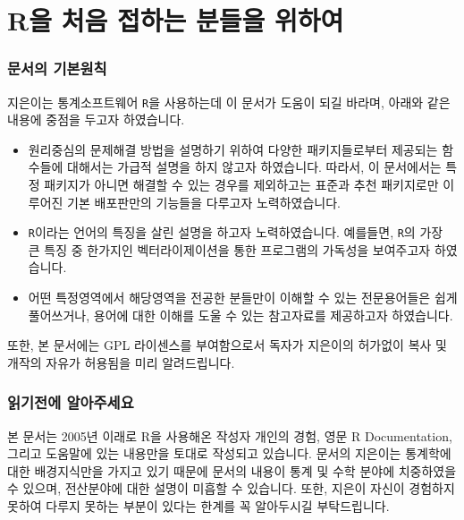 \documentclass[tutorial.tex]{subfiles}
\begin{document}
	
\part{R을 처음 접하는 분들을 위하여}

\section*{문서의 기본원칙} 

지은이는 통계소프트웨어 \texttt{R}을 사용하는데 이 문서가 도움이 되길 바라며, 아래와 같은 내용에 중점을 두고자 하였습니다. 

\begin{itemize}
\item 원리중심의 문제해결 방법을 설명하기 위하여 다양한 패키지들로부터 제공되는 함수들에 대해서는 가급적 설명을 하지 않고자 하였습니다. 
따라서, 이 문서에서는 특정 패키지가 아니면 해결할 수 있는 경우를 제외하고는 표준과 추천 패키지로만 이루어진 기본 배포판만의 기능들을 다루고자 노력하였습니다.

\item \texttt{R}이라는 언어의 특징을 살린 설명을 하고자 노력하였습니다. 
예를들면, \texttt{R}의 가장 큰 특징 중 한가지인 벡터라이제이션을 통한 프로그램의 가독성을 보여주고자 하였습니다. 

\item 어떤 특정영역에서 해당영역을 전공한 분들만이 이해할 수 있는 전문용어들은 쉽게 풀어쓰거나, 용어에 대한 이해를 도울 수 있는 참고자료를 제공하고자 하였습니다. 
\end{itemize}

또한, 본 문서에는 GPL 라이센스를 부여함으로서 독자가 지은이의 허가없이 복사 및 개작의 자유가 허용됨을 미리 알려드립니다.  

\section*{읽기전에 알아주세요}

본 문서는 2005년 이래로 R을 사용해온 작성자 개인의 경험, 영문 R Documentation, 그리고 도움말에 있는 내용만을 토대로 작성되고 있습니다.
문서의 지은이는 통계학에 대한 
배경지식만을 가지고 있기 때문에 문서의 내용이 통계 및 수학 분야에 치중하였을 수 있으며, 
전산분야에 대한 설명이 미흡할 수 있습니다. 
또한, 지은이 자신이 경험하지 못하여 다루지 못하는 부분이 있다는 한계를 꼭 알아두시길 부탁드립니다. 
\end{document}
